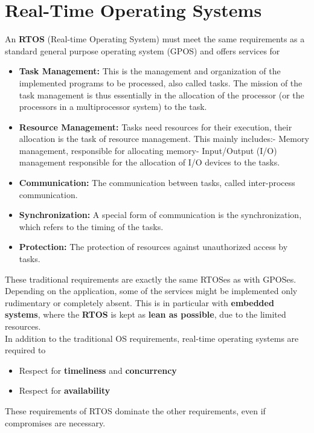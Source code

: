 \section{Real-Time Operating Systems}

An \textbf{RTOS} (Real-time Operating System) must meet the same requirements as a standard general purpose operating system (GPOS) and offers services for

\begin{itemize}
\item  \textbf{Task Management: }This is the management and organization of the implemented programs to be processed, also called tasks. The mission of the task management is thus essentially in the allocation of the processor (or the processors in a multiprocessor system) to the task.
\item  \textbf{Resource Management: }Tasks need resources for their execution, their allocation is the task of resource management. This mainly includes:- Memory management, responsible for allocating memory- Input/Output (I/O) management responsible for the allocation of I/O devices to  the tasks.
\item  \textbf{Communication: }The communication between tasks, called inter-process communication.
\item  \textbf{Synchronization: }A special form of communication is the synchronization, which refers to the timing of the tasks.
\item  \textbf{Protection: }The protection of resources against unauthorized access by tasks.
\end{itemize}

These traditional requirements are exactly the same RTOSes as with GPOSes. Depending on the application, some of the services might be implemented only  rudimentary or completely absent. This is in particular with \textbf{embedded} \textbf{systems}, where the \textbf{RTOS} is kept as \textbf{lean as possible}, due to the limited resources.\\

In addition to the traditional OS requirements, real-time operating systems are required to 

\begin{itemize}
	\item  Respect for \textbf{timeliness} and \textbf{concurrency}
	\item  Respect for \textbf{availability}
\end{itemize}

These requirements of RTOS dominate the other requirements, even if compromises are necessary.

